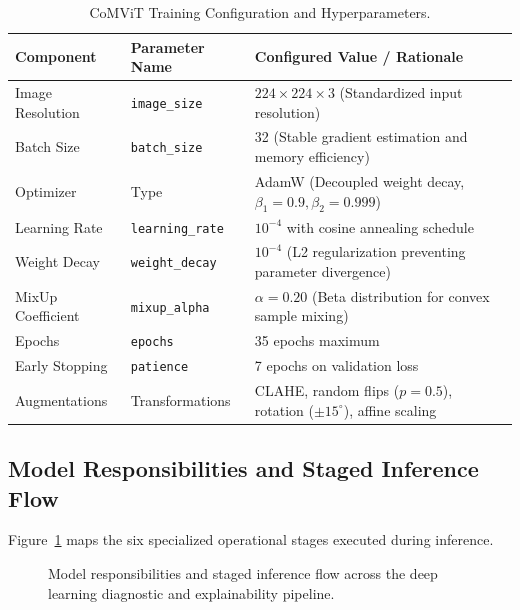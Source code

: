 \documentclass[12pt,a4paper]{report}
\renewcommand{\textbf}[1]{#1}
\begin{document}
\begin{table}[H]
\centering
\caption{CoMViT Training Configuration and Hyperparameters.}
\label{tab:ml_hyperparameters}
\small
\begin{tabularx}{\textwidth}{l p{4.2cm} X}
\toprule
\textbf{Component} & \textbf{Parameter Name} & \textbf{Configured Value / Rationale} \\
\midrule
Image Resolution & \texttt{image\_size} & $224 \times 224 \times 3$ (Standardized input resolution) \\
Batch Size & \texttt{batch\_size} & 32 (Stable gradient estimation and memory efficiency) \\
Optimizer & Type & AdamW (Decoupled weight decay, $\beta_1=0.9, \beta_2=0.999$) \\
Learning Rate & \texttt{learning\_rate} & $10^{-4}$ with cosine annealing schedule \\
Weight Decay & \texttt{weight\_decay} & $10^{-4}$ (L2 regularization preventing parameter divergence) \\
MixUp Coefficient & \texttt{mixup\_alpha} & $\alpha = 0.20$ (Beta distribution for convex sample mixing) \\
Epochs & \texttt{epochs} & 35 epochs maximum \\
Early Stopping & \texttt{patience} & 7 epochs on validation loss \\
Augmentations & Transformations & CLAHE, random flips ($p=0.5$), rotation ($\pm 15^\circ$), affine scaling \\
\bottomrule
\end{tabularx}
\end{table}

\subsection{Model Responsibilities and Staged Inference Flow}
Figure~\ref{fig:ml_inference_flow} maps the six specialized operational stages executed during inference.

\begin{figure}[H]
    \centering
    \caption{Model responsibilities and staged inference flow across the deep learning diagnostic and explainability pipeline.}
    \label{fig:ml_inference_flow}
\end{figure}
\end{document}
